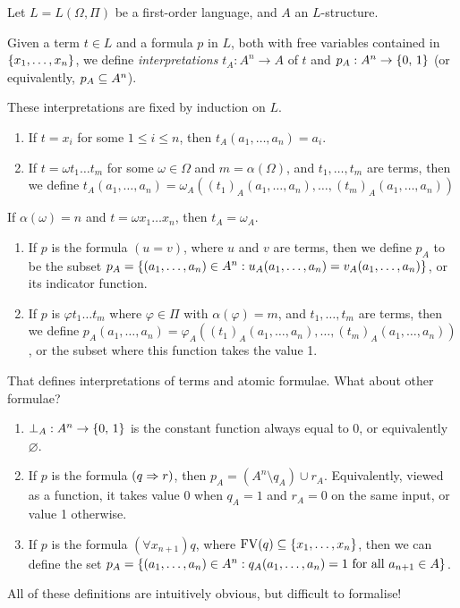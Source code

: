 \documentclass{article}
\begin{document}
\begin{definition}[Interpretation]
    Let $L = L(\Omega, \Pi)$ be a first-order language, and $A$ an $L$-structure.
    
    Given a term $t \in L$ and a formula $p$ in $L$, both with free variables contained in $\left\lbrace x_1, \dots, x_n \right\rbrace$, we define \textit{interpretations} $t_A : A^n \to A$ of $t$ and $p_A : A^n \to \left\lbrace 0, \, 1 \right\rbrace$ (or equivalently, $p_A \subseteq A^n$).
    
    These interpretations are fixed by induction on $L$.
    \begin{enumerate}
    	\item If $t = x_i$ for some $1 \leq i \leq n$, then $t_A(a_1, \dots, a_n) = a_i$.
    	\item If $t = \omega t_1 \dots t_m$ for some $\omega \in \Omega$ and $m = \alpha(\Omega)$, and $t_1, \dots, t_m$ are terms, then we define $t_A(a_1, \dots, a_n) = \omega_A((t_1)_A(a_1, \dots, a_n), \dots, (t_m)_A(a_1, \dots, a_n))$
	\end{enumerate}
	If $\alpha(\omega) = n$ and $t = \omega x_1 \dots x_n$, then $t_A = \omega_A$.
	\begin{enumerate}
	    \item If $p$ is the formula $(u = v)$, where $u$ and $v$ are terms, then we define $p_A$ to be the subset $p_A = \left\lbrace (a_1, \dots, a_n) \in A^n : u_A(a_1, \dots, a_n) = v_A(a_1, \dots, a_n) \right\rbrace$, or its indicator function.
	    \item If $p$ is $\varphi t_1 \dots t_m$ where $\varphi \in \Pi$ with $\alpha(\varphi) = m$, and $t_1, \dots, t_m$ are terms, then we define $p_A(a_1, \dots, a_n) = \varphi_A((t_1)_A(a_1, \dots, a_n), \dots, (t_m)_A(a_1, \dots, a_n))$, or the subset where this function takes the value 1.
	\end{enumerate}
	That defines interpretations of terms and atomic formulae. What about other formulae?
	\begin{enumerate}
	    \item $\bot_A : A^n \to \left\lbrace 0, \, 1 \right\rbrace$ is the constant function always equal to 0, or equivalently $\varnothing$.
	    \item If $p$ is the formula $(q \Rightarrow r)$, then $p_A = (A^n \setminus q_A) \cup r_A$. Equivalently, viewed as a function, it takes value 0 when $q_A = 1$ and $r_A = 0$ on the same input, or value 1 otherwise.
	    \item If $p$ is the formula $(\forall x_{n+1}) q$, where $\mathrm{FV}(q) \subseteq \left\lbrace x_1, \dots, x_n \right\rbrace$, then we can define the set $p_A = \left\lbrace (a_1, \dots, a_n) \in A^n : q_A(a_1, \dots, a_n) = 1 \text{ for all } a_{n+1} \in A \right\rbrace$.
	\end{enumerate}
	All of these definitions are intuitively obvious, but difficult to formalise!
\end{definition}
\end{document}
